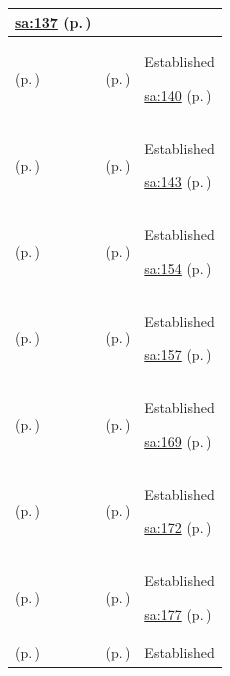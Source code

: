 \begin{longtable}{|>{\raggedright\arraybackslash}p{0.27\TableWidth}|>{\raggedright\arraybackslash}p{0.27\TableWidth}|>{\raggedright\arraybackslash}p{0.46\TableWidth}|}
 \hyperref[rad:sa:130]{sa:137} (p.\,\pageref{rad:sa:130})\\\hline
\nameref{service:dispense-event-ingress} (p.\,\pageref{service:dispense-event-ingress}) & \nameref{feature:feat-sa-19} (p.\,\pageref{feature:feat-sa-19}) & Established

 \hyperref[rad:sa:130]{sa:140} (p.\,\pageref{rad:sa:130})\\\hline
\nameref{service:medication-administration-ingress} (p.\,\pageref{service:medication-administration-ingress}) & \nameref{feature:feat-sa-20} (p.\,\pageref{feature:feat-sa-20}) & Established

 \hyperref[rad:sa:130]{sa:143} (p.\,\pageref{rad:sa:130})\\\hline
\nameref{service:procedure-booking-ingress} (p.\,\pageref{service:procedure-booking-ingress}) & \nameref{feature:feat-sa-21} (p.\,\pageref{feature:feat-sa-21}) & Established

 \hyperref[rad:sa:149]{sa:154} (p.\,\pageref{rad:sa:149})\\\hline
\nameref{service:procedural-documentation-ingress} (p.\,\pageref{service:procedural-documentation-ingress}) & \nameref{feature:feat-sa-22} (p.\,\pageref{feature:feat-sa-22}) & Established

 \hyperref[rad:sa:149]{sa:157} (p.\,\pageref{rad:sa:149})\\\hline
\nameref{service:clinical-document-ingress} (p.\,\pageref{service:clinical-document-ingress}) & \nameref{feature:feat-sa-23} (p.\,\pageref{feature:feat-sa-23}) & Established

 \hyperref[rad:sa:163]{sa:169} (p.\,\pageref{rad:sa:163})\\\hline
\nameref{service:clinical-document-lifecycle-service} (p.\,\pageref{service:clinical-document-lifecycle-service}) & \nameref{feature:feat-sa-24} (p.\,\pageref{feature:feat-sa-24}) & Established

 \hyperref[rad:sa:163]{sa:172} (p.\,\pageref{rad:sa:163})\\\hline
\nameref{service:document-metadata-registry-query} (p.\,\pageref{service:document-metadata-registry-query}) & \nameref{feature:feat-sa-25} (p.\,\pageref{feature:feat-sa-25}) & Established

 \hyperref[rad:sa:163]{sa:177} (p.\,\pageref{rad:sa:163})\\\hline
\nameref{service:care-plan-ingress} (p.\,\pageref{service:care-plan-ingress}) & \nameref{feature:feat-sa-26} (p.\,\pageref{feature:feat-sa-26}) & Established


\end{longtable}
